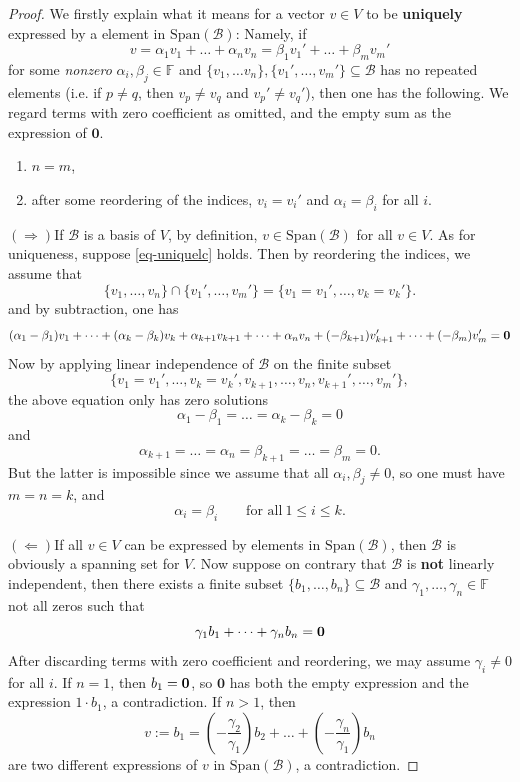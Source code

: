 \begin{proof}
    We firstly explain what it means for a vector $v \in V$ to be {\bf uniquely} expressed by a element in $\mathrm{Span}(\mathcal{B})$: Namely, if 
    \begin{equation} \label{eq-uniquelc}
    v = \alpha_1v_1 + \dots + \alpha_nv_n = \beta_1v_1' + \dots + \beta_mv_m' \tag{*}
    \end{equation}
    for some {\it nonzero} $\alpha_i, \beta_j \in \mathbb{F}$ and $\{v_1, \dots v_n\}, \{v_1', \dots, v_m'\} \subseteq \mathcal{B}$ has no repeated elements (i.e. if $p \neq q$, then $v_p \neq v_q$ and $v_p' \neq v_q'$), then one has the following. We regard terms with zero coefficient as omitted, and the empty sum as the expression of $\mathbf{0}$.
    \begin{enumerate}
        \item $n = m$,
        \item after some reordering of the indices, $v_i = v_i'$ and $\alpha_i = \beta_i$ for all $i$.
    \end{enumerate}
    

    \noindent $(\Rightarrow) $If $\mathcal{B}$ is a basis of $V$, by definition, $v \in\mathrm{Span}(\mathcal{B})$ for all $v \in V$. As for uniqueness, suppose \eqref{eq-uniquelc} holds. Then by reordering the indices, we assume that
    $$\{v_1,\dots, v_n\} \cap \{v_1', \dots, v_m'\} = \{v_1 = v_1', \dots, v_k = v_k'\}.$$
    and by subtraction, one has
    $$(\alpha_1 - \beta_1)v_1 + \dots + (\alpha_k - \beta_k) v_k + \alpha_{k+1} v_{k+1} + \dots + \alpha_n v_{n} + (-\beta_{k+1})v_{k+1}' + \dots + (-\beta_{m}) v_{m}' = {\bf 0}$$
    Now by applying linear independence of $\mathcal{B}$ on the finite subset
    $$\{v_1 = v_1', \dots, v_k = v_k', v_{k+1}, \dots, v_n, v_{k+1}', \dots, v_m'\},$$
    the above equation only has zero solutions
    $$\alpha_1 - \beta_1 = \dots = \alpha_k - \beta_k = 0$$
    and
    $$\alpha_{k+1} = \dots =\alpha_n = \beta_{k+1} = \dots = \beta_m = 0.$$ But the latter is impossible since we assume that all $\alpha_i, \beta_j \neq 0$, so one must have $m = n = k$, and 
    $$\alpha_i = \beta_i \quad \quad \text{for all}\ 1 \leq i \leq k.$$

    \noindent $(\Leftarrow) $If all $v \in V$ can be expressed by elements in $\mathrm{Span}(\mathcal{B})$, then $\mathcal{B}$ is obviously a spanning set for $V$. Now suppose on contrary that $\mathcal{B}$ is {\bf not} linearly independent, then there exists a finite subset $\{b_1,\dots, b_n\} \subseteq \mathcal{B}$ and $\gamma_1, \dots, \gamma_n \in \mathbb{F}$ not all zeros such that
    $$\gamma_1b_1 + \dots + \gamma_nb_n = {\bf 0}$$
    After discarding terms with zero coefficient and reordering, we may assume $\gamma_i \neq 0$ for all $i$. If $n=1$, then $b_1={\bf 0}$, so $\mathbf{0}$ has both the empty expression and the expression $1\cdot b_1$, a contradiction. If $n>1$, then
    $$v := b_1 = (-\frac{\gamma_2}{\gamma_1}) b_2 + \dots + (-\frac{\gamma_n}{\gamma_1})b_n$$
    are two different expressions of $v$ in $\mathrm{Span}(\mathcal{B})$, a contradiction. 
    

\end{proof}
